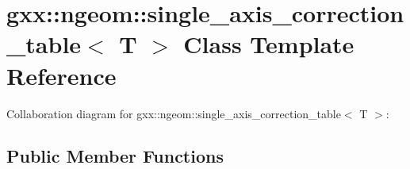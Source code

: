 \hypertarget{classgxx_1_1ngeom_1_1single__axis__correction__table}{}\section{gxx\+:\+:ngeom\+:\+:single\+\_\+axis\+\_\+correction\+\_\+table$<$ T $>$ Class Template Reference}
\label{classgxx_1_1ngeom_1_1single__axis__correction__table}


Collaboration diagram for gxx\+:\+:ngeom\+:\+:single\+\_\+axis\+\_\+correction\+\_\+table$<$ T $>$\+:
\subsection*{Public Member Functions}
